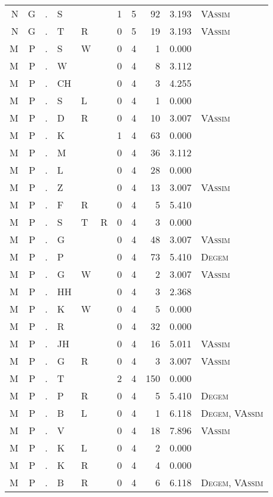 \begin{longtable}{r@{ } r@{ } c@{ } l@{ } l@{ } l@{ } r r r r l }
N & G & . & S &  &  & 1 & 5 & 92 & 3.193 & \textsc{VAssim} \\
N & G & . & T & R &  & 0 & 5 & 19 & 3.193 & \textsc{VAssim} \\
M & P & . & S & W &  & 0 & 4 & 1 & 0.000 &  \\
M & P & . & W &  &  & 0 & 4 & 8 & 3.112 &  \\
M & P & . & CH &  &  & 0 & 4 & 3 & 4.255 &  \\
M & P & . & S & L &  & 0 & 4 & 1 & 0.000 &  \\
M & P & . & D & R &  & 0 & 4 & 10 & 3.007 & \textsc{VAssim} \\
M & P & . & K &  &  & 1 & 4 & 63 & 0.000 &  \\
M & P & . & M &  &  & 0 & 4 & 36 & 3.112 &  \\
M & P & . & L &  &  & 0 & 4 & 28 & 0.000 &  \\
M & P & . & Z &  &  & 0 & 4 & 13 & 3.007 & \textsc{VAssim} \\
M & P & . & F & R &  & 0 & 4 & 5 & 5.410 &  \\
M & P & . & S & T & R & 0 & 4 & 3 & 0.000 &  \\
M & P & . & G &  &  & 0 & 4 & 48 & 3.007 & \textsc{VAssim} \\
M & P & . & P &  &  & 0 & 4 & 73 & 5.410 & \textsc{Degem} \\
M & P & . & G & W &  & 0 & 4 & 2 & 3.007 & \textsc{VAssim} \\
M & P & . & HH &  &  & 0 & 4 & 3 & 2.368 &  \\
M & P & . & K & W &  & 0 & 4 & 5 & 0.000 &  \\
M & P & . & R &  &  & 0 & 4 & 32 & 0.000 &  \\
M & P & . & JH &  &  & 0 & 4 & 16 & 5.011 & \textsc{VAssim} \\
M & P & . & G & R &  & 0 & 4 & 3 & 3.007 & \textsc{VAssim} \\
M & P & . & T &  &  & 2 & 4 & 150 & 0.000 &  \\
M & P & . & P & R &  & 0 & 4 & 5 & 5.410 & \textsc{Degem} \\
M & P & . & B & L &  & 0 & 4 & 1 & 6.118 & \textsc{Degem}, \textsc{VAssim} \\
M & P & . & V &  &  & 0 & 4 & 18 & 7.896 & \textsc{VAssim} \\
M & P & . & K & L &  & 0 & 4 & 2 & 0.000 &  \\
M & P & . & K & R &  & 0 & 4 & 4 & 0.000 &  \\
M & P & . & B & R &  & 0 & 4 & 6 & 6.118 & \textsc{Degem}, \textsc{VAssim} \\

\end{longtable}
